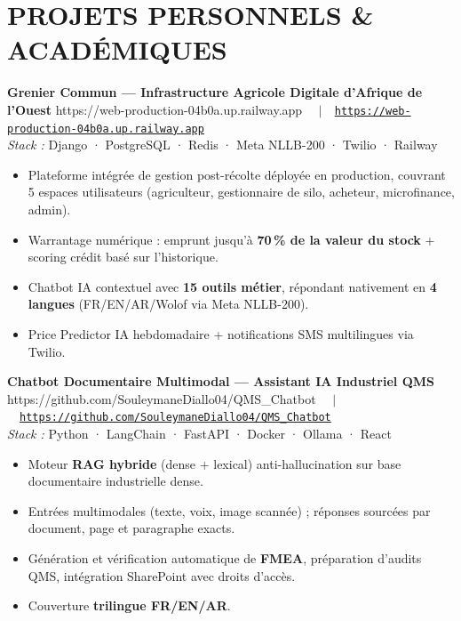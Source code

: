 \documentclass[10pt, a4paper]{article}
\newcommand{\projentry}[3]{%
  \textbf{#1}%
  \ifx\relax#3\relax\else
    \ \ {\small\color{muted}$|$}\ \ {\small\href{#3}{\color{accent}\texttt{#3}}}%
  \fi\\
  {\small\color{muted}\textit{Stack :} #2}%
}
\begin{document}
\section{PROJETS PERSONNELS \& ACADÉMIQUES}

\projentry{Grenier Commun — Infrastructure Agricole Digitale d'Afrique de l'Ouest}
          {Django · PostgreSQL · Redis · Meta NLLB-200 · Twilio · Railway}
          {https://web-production-04b0a.up.railway.app}

\vspace{4pt}
\begin{itemize}
  \item Plateforme intégrée de gestion post-récolte déployée en production, couvrant 5 espaces utilisateurs (agriculteur, gestionnaire de silo, acheteur, microfinance, admin).
  \item Warrantage numérique : emprunt jusqu'à \textbf{70\,\% de la valeur du stock} + scoring crédit basé sur l'historique.
  \item Chatbot IA contextuel avec \textbf{15 outils métier}, répondant nativement en \textbf{4 langues} (FR/EN/AR/Wolof via Meta NLLB-200).
  \item Price Predictor IA hebdomadaire + notifications SMS multilingues via Twilio.
\end{itemize}

\vspace{6pt}

\projentry{Chatbot Documentaire Multimodal — Assistant IA Industriel QMS}
          {Python · LangChain · FastAPI · Docker · Ollama · React}
          {https://github.com/SouleymaneDiallo04/QMS\_Chatbot}

\vspace{4pt}
\begin{itemize}
  \item Moteur \textbf{RAG hybride} (dense + lexical) anti-hallucination sur base documentaire industrielle dense.
  \item Entrées multimodales (texte, voix, image scannée) ; réponses sourcées par document, page et paragraphe exacts.
  \item Génération et vérification automatique de \textbf{FMEA}, préparation d'audits QMS, intégration SharePoint avec droits d'accès.
  \item Couverture \textbf{trilingue FR/EN/AR}.
\end{itemize}

\vspace{6pt}
\end{document}
